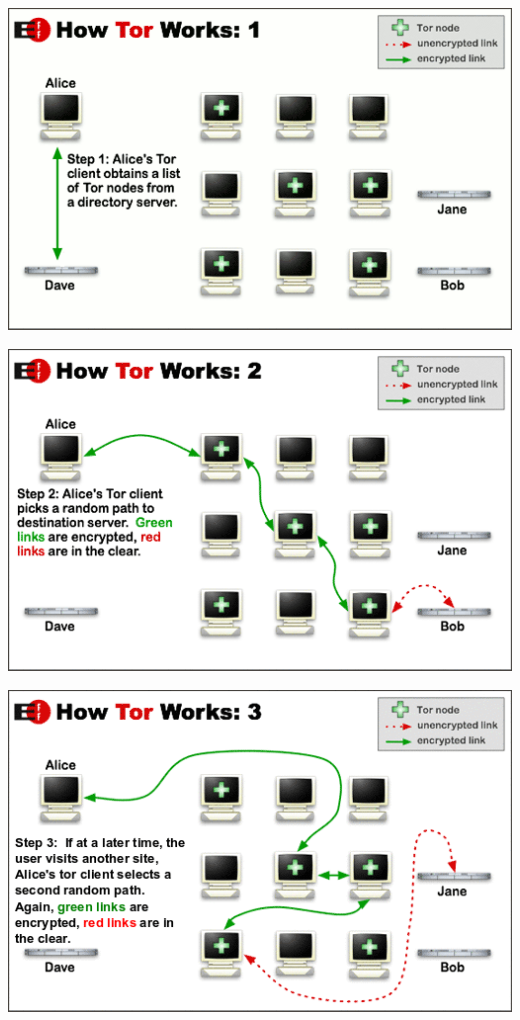 \documentclass[11pt]{article}
\begin{document}
\begin{center}
\includegraphics[natwidth=510bp,natheight=326bp,width= 0.7\linewidth]{appendix/htw1.png}
\end{center}


\begin{center}
\includegraphics[natwidth=510bp,natheight=326bp,width= 0.7\linewidth]{appendix/htw2.png}
\end{center}


\begin{center}
\includegraphics[natwidth=510bp,natheight=326bp,width= 0.7\linewidth]{appendix/htw3.png}
\end{center}

\newpage

\nocite{*}




\end{document}
